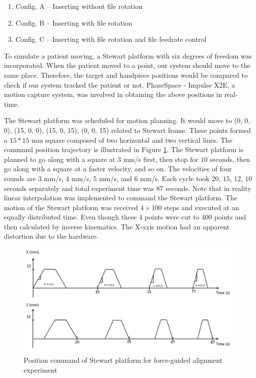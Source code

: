 \begin{enumerate}
\item[] Config. A -- Inserting without file rotation
\item[] Config. B -- Inserting with file rotation
\item[] Config. C -- Inserting with file rotation and file feedrate control
\end{enumerate}
\par
To simulate a patient moving, a Stewart platform with six degrees of freedom was incorporated.  When the patient moved to a point, our system should move to the same place. Therefore, the target and handpiece positions would be compared to check if our system tracked the patient or not. PhaseSpace - Impulse X2E, a motion capture system, was involved in obtaining the above positions in real-time. 
\par
The Stewart platform was scheduled for motion planning. It would move to (0, 0, 0), (15, 0, 0), (15, 0, 15), (0, 0, 15) related to Stewart frame. These points formed a $15*15$ mm square composed of two horizontal and two vertical lines. The command position trajectory is illustrated in Figure \ref{fig: position command}. The Stewart platform is planned to go along with a square at $3$ mm/s first, then stop for $10$ seconds, then go along with a square at a faster velocity, and so on. The velocities of four rounds are $3$ mm/s, $4$ mm/s, $5$ mm/s, and $6$ mm/s. Each cycle took $20$, $15$, $12$, $10$ seconds separately and total experiment time was $87$ seconds. Note that in reality linear interpolation was implemented to command the Stewart platform. The motion of the Stewart platform was received $4 \times 100$ steps and executed at an equally distributed time. Even though these $4$ points were cut to $400$ points and then calculated by inverse kinematics. The X-axis motion had an apparent distortion due to the hardware.
\begin{figure}[htbp]
\begin{center}
\includegraphics[width=1\linewidth]{Images/position command.png}
\caption{Position command of Stewart platform for force-guided alignment experiment}
\label{fig: position command}
\end{center}
\end{figure}	
